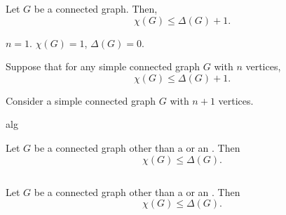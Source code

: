 \begin{frame}{}
  \begin{theorem}
    Let $G$ be a  connected graph. Then,
    \[
      \chi(G) \le \Delta(G) + 1.
    \]
  \end{theorem}

  \pause
  \begin{center}

    \pause
    \vspace{0.20cm}
    \begin{description}
      \setlength{\itemsep}{5pt}
      \item[Basis Step:] $n = 1$. $\chi(G) = 1$, $\Delta(G) = 0$.
      \item[Induction Hypothesis:] Suppose that for any simple connected graph $G$
        with $n$ vertices,
        \[
          \chi(G) \le \Delta(G) + 1.
        \]
      \item[Induction Step:] Consider a simple connected graph $G$ with $n+1$ vertices.
    \end{description}
  \end{center}
\end{frame}

\begin{frame}{}
  alg
\end{frame}

\begin{frame}{}
  \begin{theorem}
    Let $G$ be a  connected graph other than a 
    or an . Then
    \[
      \chi(G) \le \Delta(G).
    \]
  \end{theorem}

  \begin{columns}
      \pause
      \pause
  \end{columns}
\end{frame}

\begin{frame}{}
  \begin{theorem}
    Let $G$ be a  connected graph other than a 
    or an . Then
    \[
      \chi(G) \le \Delta(G).
    \]
  \end{theorem}

  \pause
  \begin{center}
  \end{center}
\end{frame}
